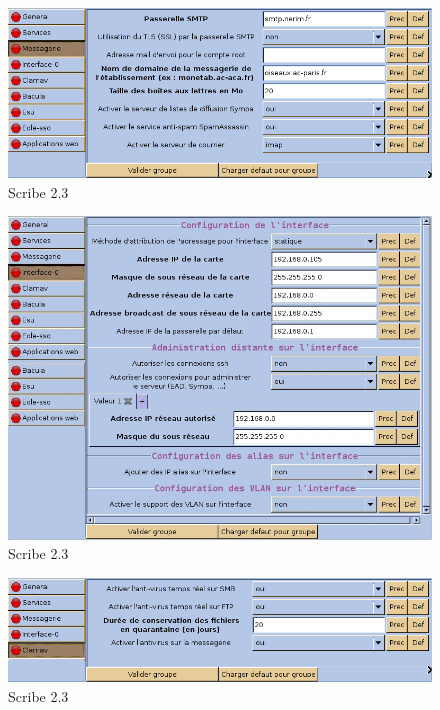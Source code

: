 \documentclass{article}
\makeatletter
\def\maxwidth{\ifdim\Gin@nat@width>\linewidth\linewidth
\else\Gin@nat@width\fi}
\let\Oldincludegraphics\includegraphics
\renewcommand{\includegraphics}[1]{\Oldincludegraphics[width=\maxwidth]{#1}}
\makeatother
\begin{document}
\begin{figure}[htbp]
\centering
\includegraphics{scribe_html_m408bb4bb.png}
\caption{Scribe 2.3}
\end{figure}

\begin{figure}[htbp]
\centering
\includegraphics{scribe_html_43381116.jpg}
\caption{Scribe 2.3}
\end{figure}

\begin{figure}[htbp]
\centering
\includegraphics{scribe_html_m672d0ca.png}
\caption{Scribe 2.3}
\end{figure}
\end{document}
